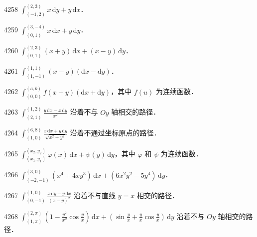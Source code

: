 
\begin{prob}[S]{4258}
$\displaystyle\int_{(-1,2)}^{(2,3)} x\,\mathrm{d}y + y\,\mathrm{d}x$．
\end{prob}

\begin{prob}[S]{4259}
$\displaystyle\int_{(0,1)}^{(3,-4)} x\,\mathrm{d}x + y\,\mathrm{d}y$．
\end{prob}

\begin{prob}[S]{4260}
$\displaystyle\int_{(0,1)}^{(2,3)} (x+y)\,\mathrm{d}x + (x-y)\,\mathrm{d}y$．
\end{prob}

\begin{prob}[S]{4261}
$\displaystyle\int_{(1,-1)}^{(1,1)} (x-y)(\mathrm{d}x - \mathrm{d}y)$．
\end{prob}

\begin{prob}[S]{4262}
$\displaystyle\int_{(0,0)}^{(a,b)} f(x+y)(\mathrm{d}x + \mathrm{d}y)$，其中 $f(u)$ 为连续函数．
\end{prob}

\begin{prob}[S]{4263}
$\displaystyle\int_{(2,1)}^{(1,2)} \frac{y\,\mathrm{d}x - x\,\mathrm{d}y}{x^2}$ 沿着不与 $Oy$ 轴相交的路径．
\end{prob}

\begin{prob}[S]{4264}
$\displaystyle\int_{(1,0)}^{(6,8)} \frac{x\,\mathrm{d}x + y\,\mathrm{d}y}{\sqrt{x^2+y^2}}$ 沿着不通过坐标原点的路径．
\end{prob}

\begin{prob}[S]{4265}
$\displaystyle\int_{(x_1,y_1)}^{(x_2,y_2)} \varphi(x)\,\mathrm{d}x + \psi(y)\,\mathrm{d}y$，其中 $\varphi$ 和 $\psi$ 为连续函数．
\end{prob}

\begin{prob}[S]{4266}
$\displaystyle\int_{(-2,-1)}^{(3,0)} (x^4 + 4xy^3)\,\mathrm{d}x + (6x^2y^2 - 5y^4)\,\mathrm{d}y$．
\end{prob}

\begin{prob}[S]{4267}
$\displaystyle\int_{(0,-1)}^{(1,0)} \frac{x\,\mathrm{d}y - y\,\mathrm{d}x}{(x-y)^2}$ 沿着不与直线 $y = x$ 相交的路径．
\end{prob}

\begin{prob}[S]{4268}
$\displaystyle\int_{(1,\pi)}^{(2,\pi)} \left(1 - \frac{y^2}{x^2}\cos\frac{y}{x}\right)\,\mathrm{d}x + \left(\sin\frac{y}{x} + \frac{y}{x}\cos\frac{y}{x}\right)\,\mathrm{d}y$ 沿着不与 $Oy$ 轴相交的路径．
\end{prob}

